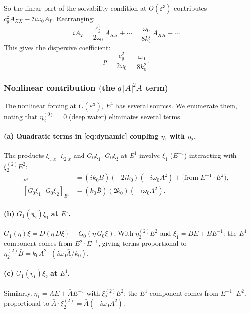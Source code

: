 \documentclass[11pt]{article}
\newcommand{\eps}{\varepsilon}
\begin{document}
So the linear part of the solvability condition at $O(\eps^3)$ contributes
$c_g^2 A_{XX} - 2i\omega_0 A_T$.
Rearranging:
\[
iA_T = \frac{c_g^2}{2\omega_0}\,A_{XX} + \cdots
= \frac{\omega_0}{8k_0^2}\,A_{XX} + \cdots
\]
This gives the dispersive coefficient:
\begin{equation}
p = \frac{c_g^2}{2\omega_0} = \frac{\omega_0}{8k_0^2}.
\label{eq:p}
\end{equation}

\subsubsection{Nonlinear contribution (the $q\,|A|^2A$ term)}

The nonlinear forcing at $O(\eps^3)$, $E^1$ has several sources.
We enumerate them, noting that $\eta_2^{(0)} = 0$ (deep water) eliminates
several terms.

\paragraph{(a) Quadratic terms in \eqref{eq:dynamic} coupling $\eta_1$ with $\eta_2$.}
The products $\xi_{1,x}\cdot\xi_{2,x}$ and $G_0\xi_1\cdot G_0\xi_2$
at $E^1$ involve
$\xi_1$ ($E^{\pm 1}$) interacting with $\xi_2^{(2)} E^2$:
\begin{align}
[\xi_{1,x}\cdot\xi_{2,x}]_{E^1}
&= (ik_0\bar B)(-2ik_0)(-i\omega_0 A^2)
+ \text{(from } E^{-1}\cdot E^2\text{)}, \\
[G_0\xi_1\cdot G_0\xi_2]_{E^1}
&= (k_0\bar B)(2k_0)(-i\omega_0 A^2).
\end{align}

\paragraph{(b) $G_1(\eta_2)\xi_1$ at $E^1$.}
$G_1(\eta)\xi = D(\eta\,D\xi) - G_0(\eta\,G_0\xi)$.
With $\eta_2^{(2)}E^2$ and $\xi_1 = BE + \bar BE^{-1}$:
the $E^1$ component comes from $E^2 \cdot E^{-1}$, giving terms
proportional to $\eta_2^{(2)}\bar B = k_0 A^2 \cdot (i\omega_0\bar A/k_0)$.

\paragraph{(c) $G_1(\eta_1)\xi_2$ at $E^1$.}
Similarly, $\eta_1 = AE + \bar AE^{-1}$ with
$\xi_2^{(2)}E^2$: the $E^1$ component comes from $E^{-1}\cdot E^2$,
proportional to $\bar A \cdot \xi_2^{(2)} = \bar A(-i\omega_0 A^2)$.
\end{document}

